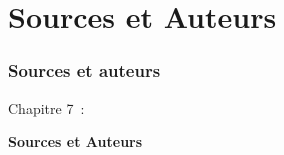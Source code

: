 %

\section{Sources et Auteurs}
\begin{frame}[fragile]
	\frametitle{Sources et auteurs}

	\begin{center}\huge{Chapitre 7~:}\end{center}
	\begin{center}\huge{\color{typo3darkgrey}\textbf{Sources et Auteurs}}\end{center}

\end{frame}


